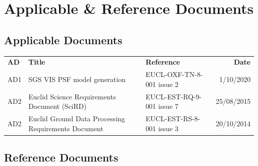 \documentclass[11pt]{EuclidVIS}
\numberwithin{table}{section}
\numberwithin{figure}{section}
\begin{document}
\newpage



\section*{Applicable \& Reference Documents}

\subsection{Applicable Documents}

\noindent
\begin{tabularx}{1.0\textwidth}{ | l | X | X | r |}
\hline
\rowcolor{gray!30}
\textbf{AD} & \textbf{Title} & \textbf{Reference} & \textbf{Date}\\
AD1 & SGS VIS PSF model generation & EUCL-OXF-TN-8-001 issue 2 & 1/10/2020 \\
\hline
AD2 & Euclid Science Requirements Document (SciRD) & EUCL-EST-RQ-9-001 issue 7 & 25/08/2015 \\
\hline
AD2 & Euclid Ground Data Processing Requirements Document & EUCL-EST-RS-8-001 issue 3 & 20/10/2014 \\
\hline
\end{tabularx}


\begingroup
\subsection{Reference Documents}
\let\clearpage\relax %
\vspace*{-3cm}
\renewcommand{\bibname}{}


\endgroup


\end{document}

